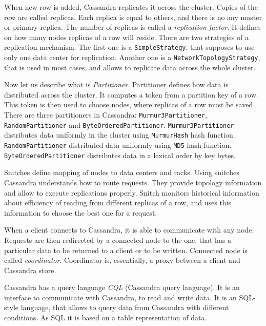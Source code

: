 When new row is added, Cassandra replicates it across the cluster.
Copies of the row are called replicas.
Each replica is equal to others, and there is no any master or primary replica.
The number of replicas is called a \textit{replication factor}.
It defines on how many nodes replicas of a row will reside.
There are two strategies of a replication mechanism.
The first one is a \lstinline{SimpleStrategy}, that supposes to use only one data center for replication.
Another one is a \lstinline{NetworkTopologyStrategy}, that is used in most cases, and allows to replicate data across the whole cluster.

Now let us describe what is \textit{Partitioner}.
Partitioner defines how data is distributed across the cluster.
It computes a token from a partition key of a row.
This token is then used to choose nodes, where replicas of a row must be saved.
There are three partitioners in Cassandra: \lstinline{Murmur3Partitioner}, \lstinline{RandomPartitioner} and \lstinline{ByteOrderedPartitioner}.
\lstinline{Murmur3Partitioner} distributes data uniformly in the cluster using \lstinline{MurmurHash} hash function.
\lstinline{RandomPartitioner} distributed data uniformly using \lstinline{MD5} hash function.
\lstinline{ByteOrderedPartitioner} distributes data in a lexical order by key bytes.

Snitches define mapping of nodes to data centers and racks.
Using snitches Cassandra understands how to route requests.
They provide topology information and allow to execute replications properly.
Snitch monitors historical information about efficiency of reading from different replicas of a row, and uses this information to choose the best one for a request.

When a client connects to Cassandra, it is able to communicate with any node. 
Requests are then redirected by a connected node to the one, that has a particular data to be returned to a client or to be written.
Connected node is called \textit{coordinator}.
Coordinator is, essentially, a proxy between a client and Cassandra store.

Cassandra has a query language \textit{CQL} (Cassandra query language).
It is an interface to communicate with Cassandra, to read and write data.
It is an SQL-style language, that allows to query data from Cassandra with different conditions.
As SQL it is based on a table representation of data.
